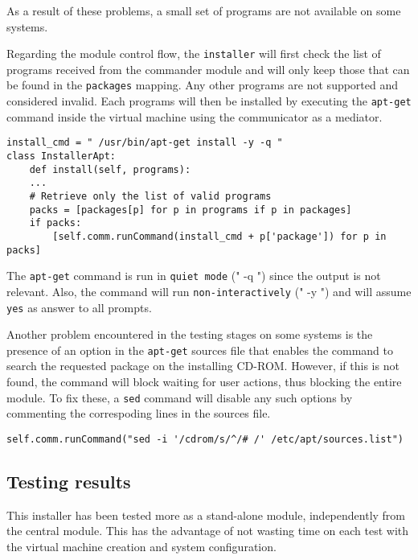 As a result of these problems, a small set of programs are not available on 
some systems.

Regarding the module control flow, the \texttt{installer} will first check the 
list of programs received from the commander module and will only keep 
those that can be found in the \texttt{packages} mapping. Any other 
programs are not supported and considered invalid. Each programs will 
then be installed by executing the \texttt{apt-get} command inside the 
virtual machine using the communicator as a mediator.
\\
\lstset{language=Python,caption=Programs install,
label=lst:install}
\begin{lstlisting}
install_cmd = " /usr/bin/apt-get install -y -q "
class InstallerApt:
	def install(self, programs):
	...
	# Retrieve only the list of valid programs
	packs = [packages[p] for p in programs if p in packages]
	if packs:
		[self.comm.runCommand(install_cmd + p['package']) for p in packs]
\end{lstlisting}

The \texttt{apt-get} command is run in \texttt{quiet mode} (" -q ") since 
the output is not relevant. Also, the command will run 
\texttt{non-interactively} (" -y ") and will assume \texttt{yes} as answer to all 
prompts\cite{apt}.

Another problem encountered in the testing stages on some systems is the 
presence of an option in the \texttt{apt-get} sources file that enables the 
command to search the requested package on the installing CD-ROM. However, 
if this is not found, the command will block waiting for user actions, thus 
blocking the entire module. To fix these, a \texttt{sed} command will disable 
any such options by commenting the correspoding lines in the sources file.
\\
\lstset{language=Python,caption=Disable cdrom option,
label=lst:disable-cdrom}
\begin{lstlisting}
self.comm.runCommand("sed -i '/cdrom/s/^/# /' /etc/apt/sources.list")
\end{lstlisting}

\subsection *{Testing results}
This installer has been tested more as a stand-alone module, independently 
from the central module. This has the advantage of not wasting time on each 
test with the virtual machine creation and system configuration.

